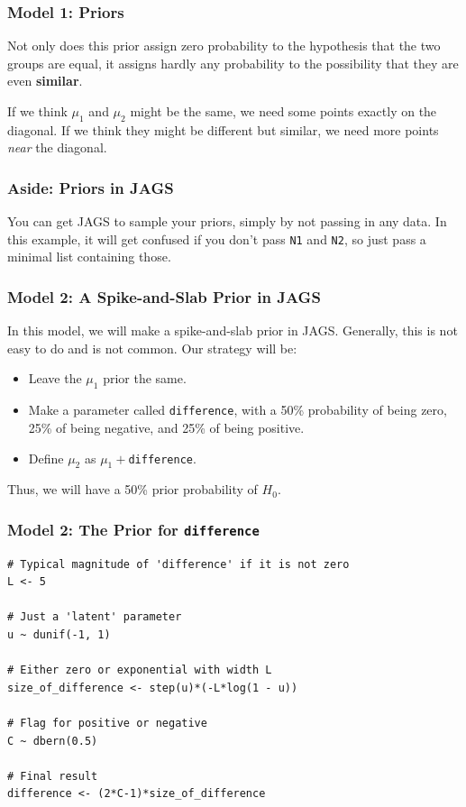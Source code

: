 \documentclass{beamer}
\begin{document}
\begin{frame}[fragile]
\frametitle{Model 1: Priors}
Not only does this prior assign zero probability to the hypothesis that the
two groups are equal, it assigns hardly any probability to the possibility
that they are even {\bf similar}.\\[0.5em]\pause

If we think $\mu_1$ and $\mu_2$ might be the same, we need some points
exactly on
the diagonal. If we think they might be different but similar, we need more
points {\em near} the diagonal.

\end{frame}



\begin{frame}[fragile]
\frametitle{Aside: Priors in JAGS}
You can get JAGS to sample your priors, simply by not passing in any data.
In this example, it will get confused if you don't pass \texttt{N1}
and \texttt{N2}, so just pass a minimal list containing those.

\end{frame}


\begin{frame}[fragile]
\frametitle{Model 2: A Spike-and-Slab Prior in JAGS}
In this model, we will make a spike-and-slab prior in JAGS. Generally, this is
not easy to do and is not common. Our strategy will be:\pause
\begin{itemize}
\item Leave the $\mu_1$ prior the same. \pause
\item Make a parameter called \texttt{difference},
with a 50\% probability of being zero, 25\% of being negative,
and 25\% of being positive.\pause
\item Define $\mu_2$ as $\mu_1 + $\texttt{difference}.\pause
\end{itemize}
Thus, we will have a 50\% prior probability of $H_0$.
\end{frame}


\begin{frame}[fragile]
\frametitle{Model 2: The Prior for \texttt{difference}}
\tiny
\begin{verbatim}
# Typical magnitude of 'difference' if it is not zero
L <- 5

# Just a 'latent' parameter
u ~ dunif(-1, 1)

# Either zero or exponential with width L
size_of_difference <- step(u)*(-L*log(1 - u))

# Flag for positive or negative
C ~ dbern(0.5)

# Final result
difference <- (2*C-1)*size_of_difference
\end{verbatim}

\end{frame}
\end{document}
